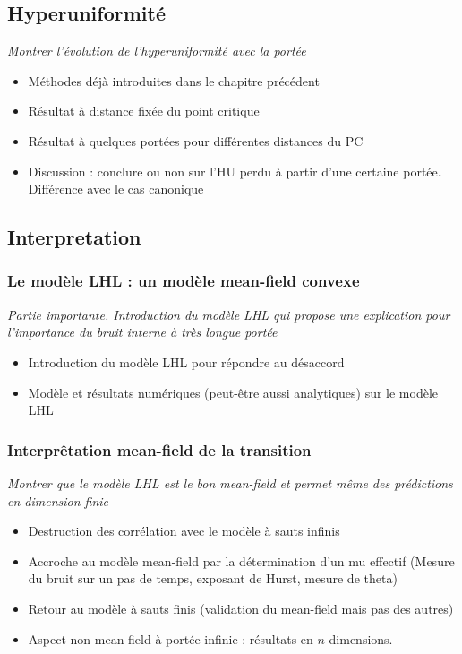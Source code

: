 \documentclass[10pt,a4paper]{article}
\begin{document}
\subsection{Hyperuniformité}

\textit{Montrer l'évolution de l'hyperuniformité avec la portée}

\begin{itemize}
	\item Méthodes déjà introduites dans le chapitre précédent
	\item Résultat à distance fixée du point critique
	\item Résultat à quelques portées pour différentes distances du PC
	 \item Discussion : conclure ou non sur l'HU perdu à partir d'une certaine portée. Différence avec le cas canonique
\end{itemize}

\subsection{Interpretation}

\subsubsection{Le modèle LHL : un modèle mean-field convexe}

\textit{Partie importante. Introduction du modèle LHL qui propose une explication pour l'importance du bruit interne à très longue portée}

\begin{itemize}
	\item Introduction du modèle LHL pour répondre au désaccord
	\item Modèle et résultats numériques (peut-être aussi analytiques) sur le modèle LHL
\end{itemize}

\subsubsection{Interprêtation mean-field de la transition}

\textit{Montrer que le modèle LHL est le bon mean-field et permet même des prédictions en dimension finie}

\begin{itemize}
	\item Destruction des corrélation avec le modèle à sauts infinis
	\item Accroche au modèle mean-field par la détermination d'un mu effectif (Mesure du bruit sur un pas de temps, exposant de Hurst, mesure de theta)
	\item Retour au modèle à sauts finis (validation du mean-field mais pas des autres)
	\item Aspect non mean-field à portée infinie : résultats en $n$ dimensions.
\end{itemize}
\end{document}
